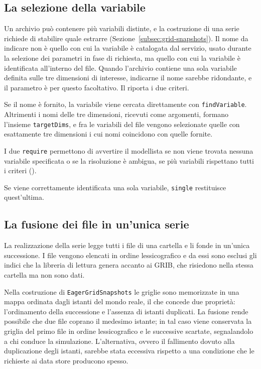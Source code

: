\subsection{La selezione della variabile}
\label{subsec:variabile-impl}

Un archivio può contenere più variabili distinte, e la costruzione di una serie richiede di
stabilire quale estrarre (Sezione~\ref{subsec:grid-snapshots}).
Il nome da indicare non è
quello con cui la variabile è catalogata dal servizio, usato durante la selezione dei
parametri in fase di richiesta, ma quello con cui la variabile è identificata all'interno
del file. Quando l'archivio contiene una sola variabile definita sulle tre dimensioni di
interesse, indicarne il nome sarebbe ridondante, e il parametro è per questo facoltativo.
Il  riporta i due criteri.



Se il nome è fornito, la variabile viene cercata direttamente con \texttt{findVariable}.
Altrimenti i nomi delle tre dimensioni, ricevuti come argomenti, formano l'insieme
\texttt{targetDims}, e fra le variabili del file vengono selezionate quelle con esattamente
tre dimensioni i cui nomi coincidono con quelle fornite.

I due \texttt{require} permettono di avvertire il modellista se non viene trovata
nessuna variabile specificata o se la risoluzione è ambigua, se più variabili rispettano
tutti i criteri ().

Se viene correttamente identificata una sola variabile, \texttt{single} restituisce quest'ultima.

\subsection{La fusione dei file in un'unica serie}
\label{subsec:serie-impl}

La realizzazione della serie legge tutti i file di una cartella e li fonde in un'unica
successione. I file vengono elencati in ordine lessicografico e da essi sono esclusi gli
indici che la libreria di lettura genera accanto ai \ac{GRIB}, che risiedono nella stessa
cartella ma non sono dati.

Nella costruzione di \texttt{EagerGridSnapshots} le griglie sono memorizzate in una mappa
ordinata dagli istanti del mondo reale, il che concede due proprietà: l'ordinamento della
successione e l'assenza di istanti duplicati. La fusione rende possibile che due file
coprano il medesimo istante; in tal caso viene conservata la griglia del primo file in
ordine lessicografico e le successive scartate, segnalandolo a chi conduce la simulazione.
L'alternativa, ovvero il fallimento dovuto alla duplicazione degli istanti, sarebbe stata
eccessiva rispetto a una condizione che le richieste ai data store producono spesso.

